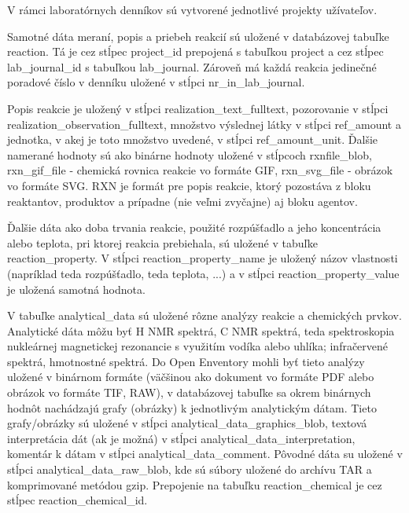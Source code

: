 \documentclass[thesis=M,slovak]{FITthesis}[2013/05/06]
\begin{document}
V rámci laboratórnych denníkov sú vytvorené jednotlivé projekty užívateľov.


Samotné dáta meraní, popis a priebeh reakcií sú uložené v databázovej tabuľke reaction. Tá je cez stĺpec project\_id prepojená s tabuľkou project a cez stĺpec lab\_journal\_id s tabuľkou lab\_journal. Zároveň má každá reakcia jedinečné poradové číslo v denníku uložené v stĺpci nr\_in\_lab\_journal.

Popis reakcie je uložený v stĺpci realization\_text\_fulltext, pozorovanie v stĺpci realization\_observation\_fulltext, množstvo výslednej látky v stĺpci ref\_amount a jednotka, v akej je toto množstvo uvedené, v stĺpci ref\_amount\_unit. Ďalšie namerané hodnoty sú ako binárne hodnoty uložené v stĺpcoch rxnfile\_blob, rxn\_gif\_file - chemická rovnica reakcie vo formáte GIF, rxn\_svg\_file - obrázok vo formáte SVG. RXN je formát pre popis reakcie, ktorý pozostáva z bloku reaktantov, produktov a prípadne (nie veľmi zvyčajne) aj bloku agentov.

Ďalšie dáta ako doba trvania reakcie, použité rozpúšťadlo a jeho koncentrácia alebo teplota, pri ktorej reakcia prebiehala, sú uložené v tabuľke reaction\_property. V stĺpci reaction\_property\_name je uložený názov vlastnosti (napríklad  teda rozpúšťadlo,  teda teplota, ...) a v stĺpci reaction\_property\_value je uložená samotná hodnota.

V tabuľke analytical\_data sú uložené rôzne analýzy reakcie a chemických prvkov. Analytické dáta môžu byť H NMR spektrá, C NMR spektrá, teda spektroskopia nukleárnej magnetickej rezonancie s využitím vodíka alebo uhlíka; infračervené spektrá, hmotnostné spektrá. Do Open Enventory mohli byť tieto analýzy uložené v binárnom formáte (väčšinou ako dokument vo formáte PDF alebo obrázok vo formáte TIF, RAW), v databázovej tabuľke sa okrem binárnych hodnôt nachádzajú grafy (obrázky) k jednotlivým analytickým dátam. Tieto grafy/obrázky sú uložené v stĺpci  analytical\_data\_graphics\_blob, textová interpretácia dát (ak je možná) v stĺpci analytical\_data\_interpretation, komentár k dátam v stĺpci analytical\_data\_comment. Pôvodné dáta su uložené v stĺpci analytical\_data\_raw\_blob, kde sú súbory uložené do archívu TAR a komprimované metódou gzip. Prepojenie na tabuľku reaction\_chemical je cez stĺpec reaction\_chemical\_id.
\end{document}
